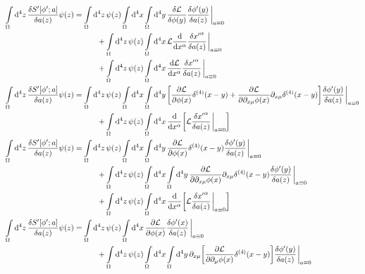 \begin{align}
    \int\limits_\Omega\dd[4]{z}\fdv{S'[\phi';a]}{a\qty(z)}\psi\qty(z)&=\int\limits_\Omega\dd[4]{z}\psi(z)\int\limits_{\Omega}\dd[4]{x}\int\limits_{\Omega}\dd[4]{y}\fdv{\mathcal L}{\phi\qty(y)}\fdv{\phi'\qty(y)}{a(z)}\eval_{a\equiv0}\nonumber\\
    &\quad\quad\quad+\int\limits_\Omega\dd[4]{z}\psi(z)\int\limits_{\Omega}\dd[4]{x}\mathcal L\dv{}{x^\alpha}\fdv{{x'}^\alpha}{a(z)}\eval_{a\equiv0}\nonumber\\
    &\quad\quad\quad+\int\limits_\Omega\dd[4]{z}\psi(z)\int\limits_{\Omega}\dd[4]{x}\dv{\mathcal L}{x^\alpha}\fdv{{x'}^\alpha}{a(z)}\eval_{a\equiv0}\\
    \int\limits_\Omega\dd[4]{z}\fdv{S'[\phi';a]}{a\qty(z)}\psi\qty(z)&=\int\limits_\Omega\dd[4]{z}\psi(z)\int\limits_{\Omega}\dd[4]{x}\int\limits_{\Omega}\dd[4]{y}\qty[\pdv{\mathcal L}{\phi\qty(x)}\delta^{\qty(4)}\qty(x-y)+\pdv{\mathcal L}{\partial_{x\mu}\phi\qty(x)}\partial_{x\mu}\delta^{\qty(4)}\qty(x-y)]\fdv{\phi'\qty(y)}{a(z)}\eval_{a\equiv0}\nonumber\\
    &\quad\quad\quad+\int\limits_\Omega\dd[4]{z}\psi(z)\int\limits_{\Omega}\dd[4]{x}\dv{}{x^\alpha}\qty[\mathcal L\fdv{{x'}^\alpha}{a(z)}\eval_{a\equiv0}]\\
    \int\limits_\Omega\dd[4]{z}\fdv{S'[\phi';a]}{a\qty(z)}\psi\qty(z)&=\int\limits_\Omega\dd[4]{z}\psi(z)\int\limits_{\Omega}\dd[4]{x}\int\limits_{\Omega}\dd[4]{y}\pdv{\mathcal L}{\phi\qty(x)}\delta^{\qty(4)}\qty(x-y)\fdv{\phi'\qty(y)}{a(z)}\eval_{a\equiv0}\nonumber\\
    &\quad\quad\quad+\int\limits_\Omega\dd[4]{z}\psi(z)\int\limits_{\Omega}\dd[4]{x}\int\limits_{\Omega}\dd[4]{y}\pdv{\mathcal L}{\partial_{x\mu}\phi\qty(x)}\partial_{x\mu}\delta^{\qty(4)}\qty(x-y)\fdv{\phi'\qty(y)}{a(z)}\eval_{a\equiv0}\nonumber\\
    &\quad\quad\quad+\int\limits_\Omega\dd[4]{z}\psi(z)\int\limits_{\Omega}\dd[4]{x}\dv{}{x^\alpha}\qty[\mathcal L\fdv{{x'}^\alpha}{a(z)}\eval_{a\equiv0}]\\
    \int\limits_\Omega\dd[4]{z}\fdv{S'[\phi';a]}{a\qty(z)}\psi\qty(z)&=\int\limits_\Omega\dd[4]{z}\psi(z)\int\limits_{\Omega}\dd[4]{x}\pdv{\mathcal L}{\phi\qty(x)}\fdv{\phi'\qty(x)}{a(z)}\eval_{a\equiv0}\nonumber\\
    &\quad\quad\quad+\int\limits_\Omega\dd[4]{z}\psi(z)\int\limits_{\Omega}\dd[4]{x}\int\limits_{\Omega}\dd[4]{y}\partial_{x\mu}\qty[\pdv{\mathcal L}{\partial_{\mu}\phi\qty(x)}\delta^{\qty(4)}\qty(x-y)]\fdv{\phi'\qty(y)}{a(z)}\eval_{a\equiv0}\nonumber\\

\end{align}
